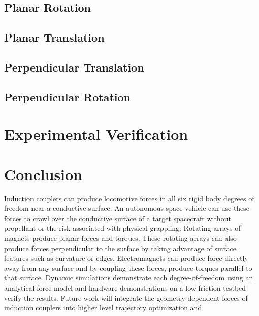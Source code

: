 \documentclass[10pt]{article}
\begin{document}
\subsection{Planar Rotation}
\subsection{Planar Translation}
\subsection{Perpendicular Translation}
\subsection{Perpendicular Rotation}
\section{Experimental Verification}
\section{Conclusion}
Induction couplers can produce locomotive forces in all six rigid body degrees of freedom near a conductive surface. An autonomous space vehicle can use these forces to crawl over the conductive surface of a target spacecraft without propellant or the risk associated with physical grappling. Rotating arrays of magnets produce planar forces and torques. These rotating arrays can also produce forces perpendicular to the surface by taking advantage of surface features such as curvature or edges. Electromagnets can produce force directly away from any surface and by coupling these forces, produce torques parallel to that surface. Dynamic simulations demonstrate each degree-of-freedom using an analytical force model and hardware demonstrations on a low-friction testbed verify the results. 
Future work will integrate the geometry-dependent forces of induction couplers into higher level trajectory optimization and      
\end{document}
